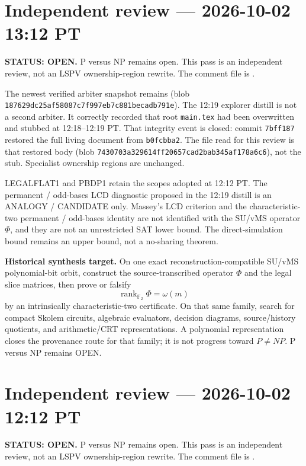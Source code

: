 \documentclass[11pt]{article}
\begin{document}
\section{Independent review --- 2026-10-02 13:12 PT}
\textbf{STATUS: OPEN.} P versus NP remains open. This pass is an independent review, not an
LSPV ownership-region rewrite. The comment file is
.

The newest verified arbiter snapshot remains
(blob \texttt{187629dc25af58087c7f997eb7c881becadb791e}).
The 12:19 explorer distill
is not a second arbiter. It correctly recorded that root \texttt{main.tex} had been overwritten
and stubbed at 12:18--12:19 PT. That integrity event is closed: commit \texttt{7bff187} restored
the full living document from \texttt{b0fcbba2}. The file read for this review is that restored
body (blob \texttt{7430703a329614ff20657cad2bab345af178a6c6}), not the stub. Specialist ownership
regions are unchanged.

LEGALFLAT1 and PBDP1 retain the scopes adopted at 12:12 PT. The permanent / odd-bases LCD
diagnostic proposed in the 12:19 distill is an ANALOGY / CANDIDATE only. Massey's LCD criterion
and the characteristic-two permanent / odd-bases identity are not identified with the SU/vMS
operator \(\Phi\), and they are not an unrestricted SAT lower bound. The direct-simulation bound
remains an upper bound, not a no-sharing theorem.

\begin{candidatebox}
\textbf{Historical synthesis target.}
On one exact reconstruction-compatible SU/vMS polynomial-bit orbit, construct the
source-transcribed operator \(\Phi\) and the legal slice matrices, then prove or falsify
\[
\operatorname{rank}_{\mathbb F_2}\Phi=\omega(m)
\]
by an intrinsically characteristic-two certificate. On that same family, search for compact
Skolem circuits, algebraic evaluators, decision diagrams, source/history quotients, and
arithmetic/CRT representations. A polynomial representation closes the provenance route for
that family; it is not progress toward \(P\neq NP\). P versus NP remains OPEN.
\end{candidatebox}



\section{Independent review --- 2026-10-02 12:12 PT}
\textbf{STATUS: OPEN.} P versus NP remains open. This pass is an independent review, not an
LSPV ownership-region rewrite. The comment file is
.
\end{document}
